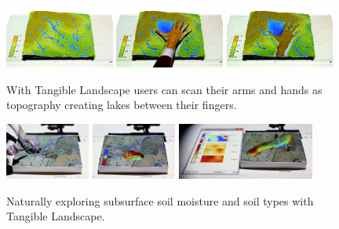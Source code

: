 \documentclass[prodmode,acmtochi]{acmsmall} %
\begin{document}
\begin{figure}
\begin{center}
		\includegraphics[width=0.32\textwidth]{images/hands/tl_hand_1.png}
		\includegraphics[width=0.32\textwidth]{images/hands/tl_hand_2.png}
		\includegraphics[width=0.32\textwidth]{images/hands/tl_hand_3.png}
	\caption{With Tangible Landscape users can scan their arms and hands as topography creating lakes between their fingers.}
	\label{fig:hands}
\end{center}
\end{figure}

\begin{figure}
\begin{center}
		\includegraphics[height=70px]{images/applications/subsurface_1.jpg}
		\includegraphics[height=70px]{images/applications/subsurface_2.jpg}
		\includegraphics[height=70px]{images/applications/subsurface_3.jpg}
	\caption{Naturally exploring subsurface soil moisture and soil types with Tangible Landscape.}
	\label{fig:subsurface}
\end{center}
\end{figure}
\end{document}
